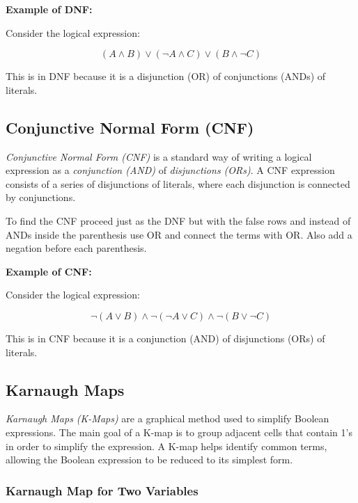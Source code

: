 \textbf{Example of DNF:}
\vspace{\baselineskip}

Consider the logical expression:

\[
	(A \land B) \lor (\neg A \land C) \lor (B \land \neg C)
\]

This is in DNF because it is a disjunction (OR) of conjunctions (ANDs) of literals.

\subsection{Conjunctive Normal Form (CNF)}

\emph{Conjunctive Normal Form (CNF)} is a standard way of writing a logical expression as a \emph{conjunction (AND)}
of \emph{disjunctions (ORs)}. A CNF expression consists of a series of disjunctions of
literals, where each disjunction is connected by conjunctions.
\vspace{\baselineskip}

To find the CNF proceed just as the DNF but with the false rows and instead
of ANDs inside the parenthesis use OR and connect the terms with OR\@. 
Also add a negation before each parenthesis.
\vspace{\baselineskip}

\textbf{Example of CNF:}
\vspace{\baselineskip}

Consider the logical expression:

\[
	\neg (A \lor B) \land \neg (\neg A \lor C) \land \neg (B \lor \neg C)
\]

This is in CNF because it is a conjunction (AND) of disjunctions (ORs) of literals.

\subsection{Karnaugh Maps}

\emph{Karnaugh Maps (K-Maps)} are a graphical method used to simplify Boolean expressions. 
The main goal of a K-map is to group adjacent cells that contain 1's in order to simplify the expression. A K-map helps identify common terms, allowing the Boolean expression to be reduced to its simplest form.

\subsubsection{Karnaugh Map for Two Variables}


